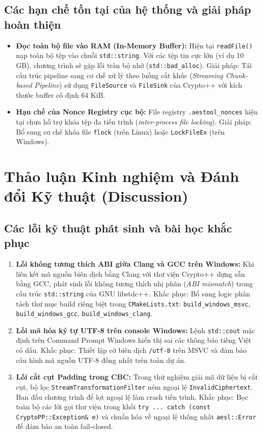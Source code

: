\documentclass[12pt, a4paper]{report}
\begin{document}
\subsection{Các hạn chế tồn tại của hệ thống và giải pháp hoàn thiện}
\begin{itemize}
    \item \textbf{Đọc toàn bộ file vào RAM (In-Memory Buffer):} Hiện tại \texttt{readFile()} nạp toàn bộ tệp vào chuỗi \texttt{std::string}. Với các tệp tin cực lớn (ví dụ 10 GB), chương trình sẽ gặp lỗi tràn bộ nhớ (\texttt{std::bad\_alloc}). Giải pháp: Tái cấu trúc pipeline sang cơ chế xử lý theo luồng cắt khúc (\textit{Streaming Chunk-based Pipeline}) sử dụng \texttt{FileSource} và \texttt{FileSink} của Crypto++ với kích thước buffer cố định 64 KiB.
    \item \textbf{Hạn chế của Nonce Registry cục bộ:} File registry \texttt{.aestool\_nonces} hiện tại chưa hỗ trợ khóa tệp đa tiến trình (\textit{inter-process file locking}). Giải pháp: Bổ sung cơ chế khóa file \texttt{flock} (trên Linux) hoặc \texttt{LockFileEx} (trên Windows).
\end{itemize}

\section{Thảo luận Kinh nghiệm và Đánh đổi Kỹ thuật (Discussion)}
\label{sec:discussion}

\subsection{Các lỗi kỹ thuật phát sinh và bài học khắc phục}
\begin{enumerate}
    \item \textbf{Lỗi không tương thích ABI giữa Clang và GCC trên Windows:} Khi liên kết mã nguồn biên dịch bằng Clang với thư viện Crypto++ dựng sẵn bằng GCC, phát sinh lỗi không tương thích nhị phân (\textit{ABI mismatch}) trong cấu trúc \texttt{std::string} của GNU libstdc++. Khắc phục: Bổ sung logic phân tách thư mục build riêng biệt trong \texttt{CMakeLists.txt}: \texttt{build\_windows\_msvc}, \texttt{build\_windows\_gcc}, \texttt{build\_windows\_clang}.
    \item \textbf{Lỗi mã hóa ký tự UTF-8 trên console Windows:} Lệnh \texttt{std::cout} mặc định trên Command Prompt Windows hiển thị sai các thông báo tiếng Việt có dấu. Khắc phục: Thiết lập cờ biên dịch \texttt{/utf-8} trên MSVC và đảm bảo cấu hình mã nguồn UTF-8 đồng nhất trên toàn dự án.
    \item \textbf{Lỗi cắt cụt Padding trong CBC:} Trong thử nghiệm giải mã dữ liệu bị cắt cụt, bộ lọc \texttt{StreamTransformationFilter} ném ngoại lệ \texttt{InvalidCiphertext}. Ban đầu chương trình để lọt ngoại lệ làm crash tiến trình. Khắc phục: Bọc toàn bộ các lời gọi thư viện trong khối \texttt{try ... catch (const CryptoPP::Exception\& e)} và chuẩn hóa về ngoại lệ thống nhất \texttt{aesl::Error} để đảm bảo an toàn fail-closed.
\end{enumerate}
\end{document}

